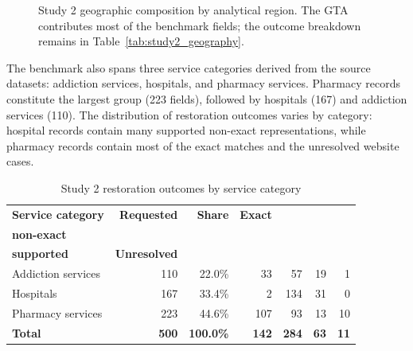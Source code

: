 \documentclass[12pt,oneside]{report}
\begin{document}
\begin{figure}[H]
\centering
{}
\caption{Study 2 geographic composition by analytical region. The GTA contributes most of the benchmark fields; the outcome breakdown remains in Table~\ref{tab:study2_geography}.}
\label{fig:study2_geography}
\end{figure}

The benchmark also spans three service categories derived from the source
datasets: addiction services, hospitals, and pharmacy services. Pharmacy
records constitute the largest group (223 fields), followed by hospitals (167)
and addiction services (110). The distribution of restoration outcomes varies
by category: hospital records contain many supported non-exact representations,
while pharmacy records contain most of the exact matches and the unresolved
website cases.

\begin{table}[H]
\caption{Study 2 restoration outcomes by service category}
\label{tab:study2_service_categories}
\centering
\small
\begin{tabularx}{\textwidth}{@{}Xrrrrrr@{}}
\toprule
\textbf{Service category} & \textbf{Requested} & \textbf{Share} & \textbf{Exact} & \makecell{\textbf{Supported,}\\\textbf{non-exact}} & \makecell{\textbf{Weakly}\\\textbf{supported}} & \textbf{Unresolved} \\
\midrule
Addiction services & 110 & 22.0\% & 33 & 57 & 19 & 1 \\
Hospitals & 167 & 33.4\% & 2 & 134 & 31 & 0 \\
Pharmacy services & 223 & 44.6\% & 107 & 93 & 13 & 10 \\
\textbf{Total} & \textbf{500} & \textbf{100.0\%} & \textbf{142} & \textbf{284} & \textbf{63} & \textbf{11} \\
\bottomrule
\end{tabularx}
\end{table}
\end{document}
